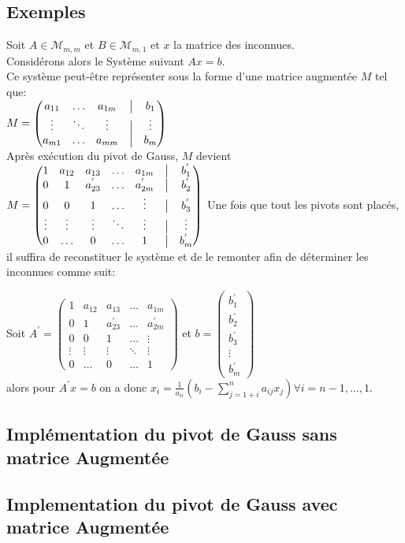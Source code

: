 \documentclass{report}
\begin{document}
\subsection{Exemples}
Soit $A \in \mathcal{M}_{m,m}$ et $B \in \mathcal{M}_{m,1}$ et $x$ la matrice des inconnues. \\
Considérons alors le Système suivant $Ax=b$.\\
Ce système peut-être représenter sous la forme d'une matrice augmentée $M$ tel que:\\
$
M =  \begin{pmatrix}
a_{11}& \ldots & a_{1m} &\bigm| & b_{1} \\
\vdots & \ddots & \vdots&\bigm| &  \vdots \\
a_{m1} & \ldots & a_{mm} &\bigm|& b_{m} 
\end{pmatrix}
$
\\
Après exécution du pivot de Gauss, $M$ devient \\
$
M =  \begin{pmatrix}
1& a_{12}& a_{13} &\ldots & a_{1m} &\bigm| & b_{1}^{'} \\
0 & 1 & a_{23}^{'}&  \ldots &a_{2m}^{'} &\bigm| & b_{2}^{'} \\
0 & 0 & 1 & \ldots &\vdots &\bigm| & b_{3}^{'} \\
\vdots & \vdots & \vdots& \ddots& \vdots &\bigm| &  \vdots \\
0 & \ldots &0 &\ldots &1&\bigm|& b_{m}^{'}
\end{pmatrix}
$
Une fois que tout les pivots sont placés, il suffira de reconstituer le système et de le remonter afin de déterminer les inconnues comme suit:

Soit $A^{'}=  \begin{pmatrix}
1& a_{12}& a_{13} &\ldots & a_{1m} \\
0 & 1 & a_{23}^{'}&  \ldots &a_{2m}^{'} \\
0 & 0 & 1 & \ldots &\vdots\\
\vdots & \vdots & \vdots& \ddots& \vdots \\
0 & \ldots &0 &\ldots &1
\end{pmatrix}
$
et $b = \begin{pmatrix}
b_{1}^{'} \\
b_{2}^{'} \\
b_{3}^{'} \\
\vdots \\
 b_{m}^{'}
\end{pmatrix}
$
\\
alors pour $A^{'}x = b$ on a donc $x_i = \frac{1}{a_{ii}}\left( b_i-\sum\limits_{j=1+i}^n a_{ij}x_j \right) \forall i = n-1, \ldots, 1$.
\subsection{Implémentation du pivot de Gauss sans matrice Augmentée}
% 
\subsection{Implementation du pivot de Gauss avec matrice Augmentée}
\end{document}
